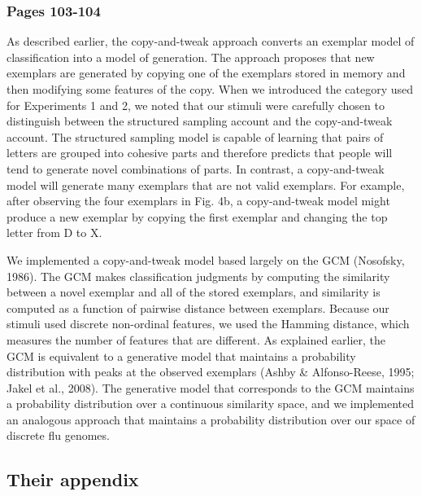 \documentclass[12pt]{article} \usepackage[letterpaper, margin=1in,
\begin{document}
\subsubsection{Pages 103-104}
\begin{displayquote} As described earlier, the copy-and-tweak approach converts
an exemplar model of classification into a model of generation. The approach
proposes that new exemplars are generated by copying one of the exemplars stored
in memory and then modifying some features of the copy. When we introduced the
category used for Experiments 1 and 2, we noted that our stimuli were carefully
chosen to distinguish between the structured sampling account and the
copy-and-tweak account. The structured sampling model is capable of learning
that pairs of letters are grouped into cohesive parts and therefore predicts
that people will tend to generate novel combinations of parts. In contrast, a
copy-and-tweak model will generate many exemplars that are not valid exemplars.
For example, after observing the four exemplars in Fig. 4b, a copy-and-tweak
model might produce a new exemplar by copying the first exemplar and changing
the top letter from D to X.

We implemented a copy-and-tweak model based largely on the GCM (Nosofsky, 1986).
The GCM makes classification judgments by computing the similarity between a
novel exemplar and all of the stored exemplars, and similarity is computed as a
function of pairwise distance between exemplars. Because our stimuli used
discrete non-ordinal features, we used the Hamming distance, which measures the
number of features that are different. As explained earlier, the GCM is
equivalent to a generative model that maintains a probability distribution with
peaks at the observed exemplars (Ashby \& Alfonso-Reese, 1995; Jakel et al.,
2008). The generative model that corresponds to the GCM maintains a probability
distribution over a continuous similarity space, and we implemented an analogous
approach that maintains a probability distribution over our space of discrete
flu genomes.
\end{displayquote}


\subsection{Their appendix}
\end{document}
